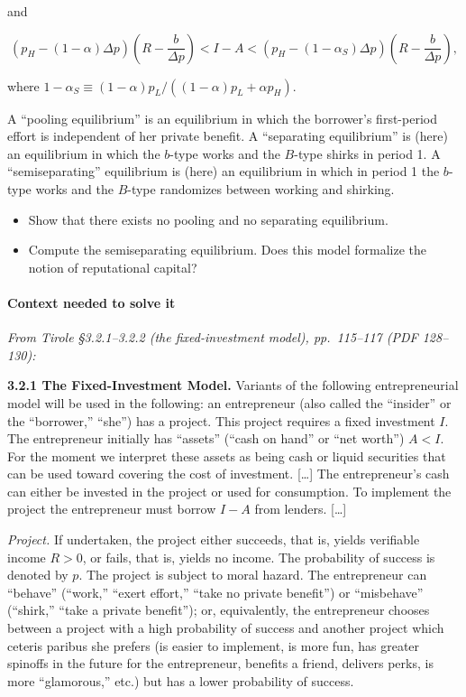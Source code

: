 \documentclass[11pt,a4paper]{article}
\providecommand{\tightlist}{\setlength{\itemsep}{0pt}\setlength{\parskip}{0pt}}
\begin{document}
and

\[(p_H - (1 - \alpha)\Delta p)\left(R - \frac{b}{\Delta p}\right) < I - A < (p_H - (1 - \alpha_S)\Delta p)\left(R - \frac{b}{\Delta p}\right),\]

where \(1 - \alpha_S \equiv (1 - \alpha)p_L/((1 - \alpha)p_L + \alpha p_H)\).

A ``pooling equilibrium'' is an equilibrium in which the borrower's first-period effort is
independent of her private benefit. A ``separating equilibrium'' is (here) an equilibrium in which
the \(b\)-type works and the \(B\)-type shirks in period 1. A ``semiseparating'' equilibrium is
(here) an equilibrium in which in period 1 the \(b\)-type works and the \(B\)-type randomizes
between working and shirking.

\begin{itemize}
\tightlist
\item
  Show that there exists no pooling and no separating equilibrium.
\item
  Compute the semiseparating equilibrium. Does this model formalize the notion of reputational
  capital?
\end{itemize}

\paragraph{Context needed to solve it}

\emph{From Tirole §3.2.1--3.2.2 (the fixed-investment model), pp.~115--117 (PDF 128--130):}

\textbf{3.2.1 The Fixed-Investment Model.} Variants of the following entrepreneurial model will be
used in the following: an entrepreneur (also called the ``insider'' or the ``borrower,'' ``she'')
has a project. This project requires a fixed investment \(I\). The entrepreneur initially has
``assets'' (``cash on hand'' or ``net worth'') \(A < I\). For the moment we interpret these assets
as being cash or liquid securities that can be used toward covering the cost of investment.
{[}\ldots{]} The entrepreneur's cash can either be invested in the project or used for consumption.
To implement the project the entrepreneur must borrow \(I - A\) from lenders. {[}\ldots{]}

\emph{Project.} If undertaken, the project either succeeds, that is, yields verifiable income
\(R > 0\), or fails, that is, yields no income. The probability of success is denoted by \(p\). The
project is subject to moral hazard. The entrepreneur can ``behave'' (``work,'' ``exert effort,''
``take no private benefit'') or ``misbehave'' (``shirk,'' ``take a private benefit''); or,
equivalently, the entrepreneur chooses between a project with a high probability of success and
another project which ceteris paribus she prefers (is easier to implement, is more fun, has greater
spinoffs in the future for the entrepreneur, benefits a friend, delivers perks, is more
``glamorous,'' etc.) but has a lower probability of success.
\end{document}
